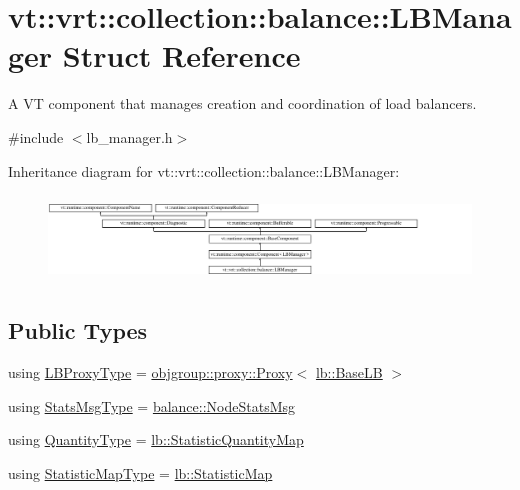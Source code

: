 \hypertarget{structvt_1_1vrt_1_1collection_1_1balance_1_1_l_b_manager}{}\section{vt\+:\+:vrt\+:\+:collection\+:\+:balance\+:\+:L\+B\+Manager Struct Reference}
\label{structvt_1_1vrt_1_1collection_1_1balance_1_1_l_b_manager}


A VT component that manages creation and coordination of load balancers.  




{\ttfamily \#include $<$lb\+\_\+manager.\+h$>$}

Inheritance diagram for vt\+:\+:vrt\+:\+:collection\+:\+:balance\+:\+:L\+B\+Manager\+:\begin{figure}[H]
\begin{center}
\leavevmode
\includegraphics[height=2.310231cm]{structvt_1_1vrt_1_1collection_1_1balance_1_1_l_b_manager}
\end{center}
\end{figure}
\subsection*{Public Types}
\begin{DoxyCompactItemize}
\item 
using \hyperlink{structvt_1_1vrt_1_1collection_1_1balance_1_1_l_b_manager_a8b1a7735366beb85c2c2ccc3912cdd80}{L\+B\+Proxy\+Type} = \hyperlink{structvt_1_1objgroup_1_1proxy_1_1_proxy}{objgroup\+::proxy\+::\+Proxy}$<$ \hyperlink{structvt_1_1vrt_1_1collection_1_1lb_1_1_base_l_b}{lb\+::\+Base\+LB} $>$
\item 
using \hyperlink{structvt_1_1vrt_1_1collection_1_1balance_1_1_l_b_manager_afedd89b1c2db43f087c1757db6200d36}{Stats\+Msg\+Type} = \hyperlink{structvt_1_1vrt_1_1collection_1_1balance_1_1_node_stats_msg}{balance\+::\+Node\+Stats\+Msg}
\item 
using \hyperlink{structvt_1_1vrt_1_1collection_1_1balance_1_1_l_b_manager_ab76adf3f0da19ba30d9f95bb882bda65}{Quantity\+Type} = \hyperlink{namespacevt_1_1vrt_1_1collection_1_1lb_aa3a389ff9262dd6be27791dcf037ef38}{lb\+::\+Statistic\+Quantity\+Map}
\item 
using \hyperlink{structvt_1_1vrt_1_1collection_1_1balance_1_1_l_b_manager_a3c6941b9c14a77e015047c659b817a85}{Statistic\+Map\+Type} = \hyperlink{namespacevt_1_1vrt_1_1collection_1_1lb_a497ad83ef5825f2ea18ed20a228870d3}{lb\+::\+Statistic\+Map}
\end{DoxyCompactItemize}
